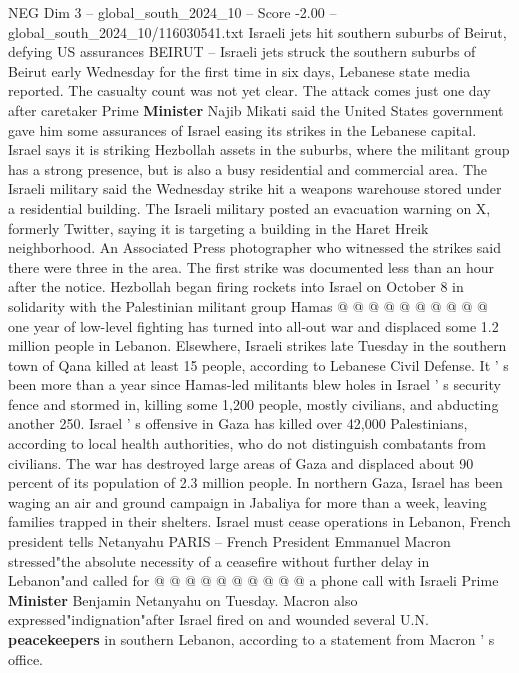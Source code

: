 \begin{textsample}{NEG Dim 3 – global\_south\_2024\_10 – Score -2.00 – global\_south\_2024\_10/116030541.txt}  \label{ex:f3_neg_098}
Israeli jets hit southern suburbs of Beirut, defying US assurances BEIRUT -- Israeli jets struck the southern suburbs of Beirut early Wednesday for the first time in six days, Lebanese state media reported.
The casualty count was not yet clear.
The attack comes just one day after caretaker Prime \textbf{Minister} Najib Mikati said the United States government gave him some assurances of Israel easing its strikes in the Lebanese capital.
Israel says it is striking Hezbollah assets in the suburbs, where the militant group has a strong presence, but is also a busy residential and commercial area.
The Israeli military said the Wednesday strike hit a weapons warehouse stored under a residential building.
The Israeli military posted an evacuation warning on X, formerly Twitter, saying it is targeting a building in the Haret Hreik neighborhood.
An Associated Press photographer who witnessed the strikes said there were three in the area.
The first strike was documented less than an hour after the notice.
Hezbollah began firing rockets into Israel on October 8 in solidarity with the Palestinian militant group Hamas @ @ @ @ @ @ @ @ @ @ one year of low-level fighting has turned into all-out war and displaced some 1.2 million people in Lebanon.
Elsewhere, Israeli strikes late Tuesday in the southern town of Qana killed at least 15 people, according to Lebanese Civil Defense.
It ' s been more than a year since Hamas-led militants blew holes in Israel ' s security fence and stormed in, killing some 1,200 people, mostly civilians, and abducting another 250.
Israel ' s offensive in Gaza has killed over 42,000 Palestinians, according to local health authorities, who do not distinguish combatants from civilians.
The war has destroyed large areas of Gaza and displaced about 90 percent of its population of 2.3 million people.
In northern Gaza, Israel has been waging an air and ground campaign in Jabaliya for more than a week, leaving families trapped in their shelters.
Israel must cease operations in Lebanon, French president tells Netanyahu PARIS -- French President Emmanuel Macron stressed"the absolute necessity of a ceasefire without further delay in Lebanon"and called for @ @ @ @ @ @ @ @ @ @ a phone call with Israeli Prime \textbf{Minister} Benjamin Netanyahu on Tuesday.
Macron also expressed"indignation"after Israel fired on and wounded several U.N. \textbf{peacekeepers} in southern Lebanon, according to a statement from Macron ' s office.

\end{textsample}
